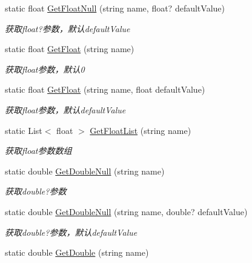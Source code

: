 \begin{DoxyCompactItemize}
static float \hyperlink{class_x_c_l_net_tools_1_1_string_hander_1_1_form_helper_a6d173378fa932b361ee69a1b671d757f}{Get\+Float\+Null} (string name, float? default\+Value)
\begin{DoxyCompactList}\small\item\em 获取float?参数，默认default\+Value \end{DoxyCompactList}\item 
static float \hyperlink{class_x_c_l_net_tools_1_1_string_hander_1_1_form_helper_a0807fb3fcdf5a5686fe0d8417013835a}{Get\+Float} (string name)
\begin{DoxyCompactList}\small\item\em 获取float参数，默认0 \end{DoxyCompactList}\item 
static float \hyperlink{class_x_c_l_net_tools_1_1_string_hander_1_1_form_helper_acae860acd22e9f85511ccdc60c071c5c}{Get\+Float} (string name, float default\+Value)
\begin{DoxyCompactList}\small\item\em 获取float参数，默认default\+Value \end{DoxyCompactList}\item 
static List$<$ float $>$ \hyperlink{class_x_c_l_net_tools_1_1_string_hander_1_1_form_helper_ad405fffedfe8e34e61e4118754f99fe4}{Get\+Float\+List} (string name)
\begin{DoxyCompactList}\small\item\em 获取float参数数组 \end{DoxyCompactList}\item 
static double \hyperlink{class_x_c_l_net_tools_1_1_string_hander_1_1_form_helper_ac19469f1fde9f3cbdadb0481dd5bb67d}{Get\+Double\+Null} (string name)
\begin{DoxyCompactList}\small\item\em 获取double?参数 \end{DoxyCompactList}\item 
static double \hyperlink{class_x_c_l_net_tools_1_1_string_hander_1_1_form_helper_a7712d7ff03a3ba4283f104d5f636352c}{Get\+Double\+Null} (string name, double? default\+Value)
\begin{DoxyCompactList}\small\item\em 获取double?参数，默认default\+Value \end{DoxyCompactList}\item 
static double \hyperlink{class_x_c_l_net_tools_1_1_string_hander_1_1_form_helper_a5ce38e7b532cf3daf4a3d564034f78ec}{Get\+Double} (string name)

\end{DoxyCompactItemize}
